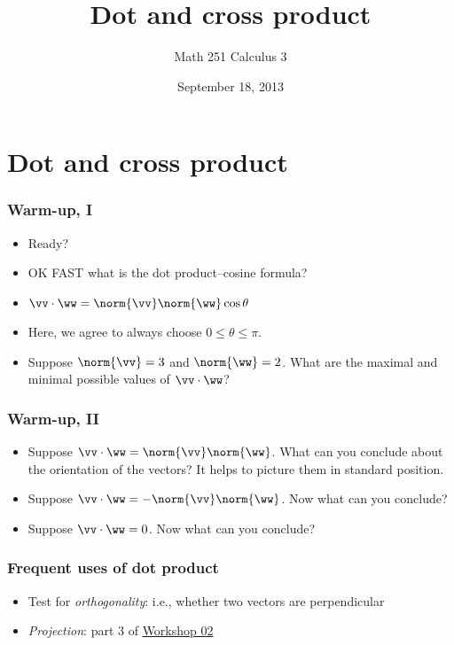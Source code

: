 \documentclass[11pt,ignorenonframetext,xcolor={svgnames},aspectratio=169]{beamer}
\title{Dot and cross product}
\author{Math 251 Calculus 3}
\date{September 18, 2013 }
\begin{document}
\frame{\titlepage}

\section{Dot and cross product}

\begin{frame}\frametitle{Warm-up, I}

\begin{itemize}
\item
  Ready?
  \pause
\item
  OK FAST what is the dot product--cosine formula?
  \pause
\item
  $\vv \cdot \ww = \norm{\vv} \norm{\ww} \cos{\theta}$
  \pause
\item
  Here, we agree to always choose $0 \leq \theta \leq \pi$.
  \pause
\item
  Suppose $\norm{\vv} = 3$ and $\norm{\ww} = 2$. What are the maximal
  and minimal possible values of $\vv \cdot \ww$?
\end{itemize}

\end{frame}

\begin{frame}\frametitle{Warm-up, II}

\begin{itemize}
\item
  Suppose $\vv \cdot \ww = \norm{\vv} \norm{\ww}$. What can you conclude
  about the orientation of the vectors? It helps to picture them in
  standard position.
  \pause
\item
  Suppose $\vv \cdot \ww = -\norm{\vv} \norm{\ww}$. Now what can you
  conclude?
  \pause
\item
  Suppose $\vv \cdot \ww = 0$. Now what can you conclude?
\end{itemize}

\end{frame}

\begin{frame}\frametitle{Frequent uses of dot product}

\begin{itemize}

\item
  Test for \emph{orthogonality}: i.e., whether two vectors are
  perpendicular
\item
  \emph{Projection}: part 3 of
  \href{../../workshops/02/Workshop.pdf}{Workshop 02}
\end{itemize}

\end{frame}
\end{document}
